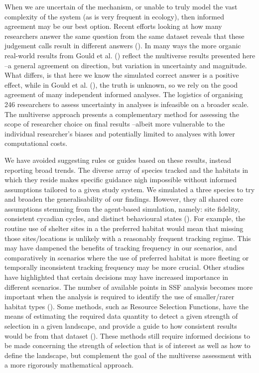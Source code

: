 \documentclass[10pt,a4paper]{article}
\begin{document}
When we are uncertain of the mechanism, or unable to truly model the vast complexity of the system (as is very frequent in ecology), then informed agreement may be our best option.
Recent efforts looking at how many researchers answer the same question from the same dataset reveals that these judgement calls result in different answers ().
In many ways the more organic real-world results from Gould et al. () reflect the multiverse results presented here --a general agreement on direction, but variation in uncertainty and magnitude.
What differs, is that here we know the simulated correct answer is a positive effect, while in Gould et al. (), the truth is unknown, so we rely on the good agreement of many independent informed analyses.
The logistics of organising 246 researchers to assess uncertainty in analyses is infeasible on a broader scale.
The multiverse approach presents a complementary method for assessing the scope of researcher choice on final results --albeit more vulnerable to the individual researcher's biases and potentially limited to analyses with lower computational costs.

We have avoided suggesting rules or guides based on these results, instead reporting broad trends.
The diverse array of species tracked and the habitats in which they reside makes specific guidance nigh impossible without informed assumptions tailored to a given study system.
We simulated a three species to try and broaden the generalisability of our findings.
However, they all shared core assumptions stemming from the agent-based simulation, namely: site fidelity, consistent cycadian cycles, and distinct behavioural states ().
For example, the routine use of shelter sites in a the preferred habitat would mean that missing those sites/locations is unlikely with a reasonably frequent tracking regime.
This may have dampened the benefits of tracking frequency in our scenarios, and comparatively in scenarios where the use of preferred habitat is more fleeting or temporally inconsistent tracking frequency may be more crucial.
Other studies have highlighted that certain decisions may have increased importance in different scenarios.
The number of available points in SSF analysis becomes more important when the analysis is required to identify the use of smaller/rarer habitat types ().
Some methods, such as Resource Selection Functions, have the means of estimating the required data quantity to detect a given strength of selection in a given landscape, and provide a guide to how consistent results would be from that dataset ().
These methods still require informed decisions to be made concerning the strength of selection that is of interest as well as how to define the landscape, but complement the goal of the multiverse assessment with a more rigorously mathematical approach.
\end{document}
